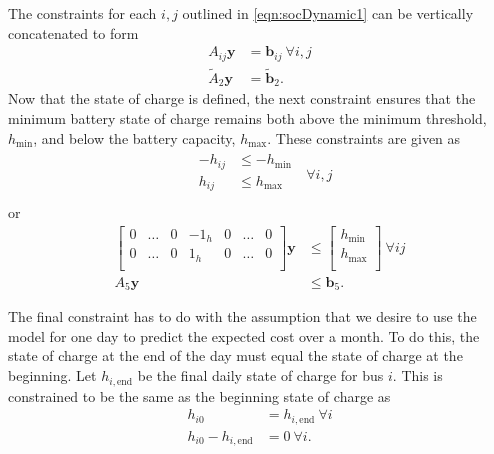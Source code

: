The constraints for each $i,j$ outlined in \eqref{eqn:socDynamic1} can be vertically concatenated to form
\begin{equation}\label{eqn:socDynamic3} \begin{aligned}
	A_{ij}\mathbf{y} &= \mathbf{b}_{ij} \ \forall i,j \\
	\tilde{A}_2\mathbf{y} &= \tilde{\mathbf{b}}_2.
\end{aligned} \end{equation}
Now that the state of charge is defined, the next constraint ensures that the minimum battery state of charge remains both above the minimum threshold, $h_{\text{min}}$, and below the battery capacity, $h_{\text{max}}$. These constraints are given as
\begin{equation}
	\begin{array}{l} \begin{aligned}
		-h_{ij} &\le -h_{\text{min}} \\
		h_{ij} &\le h_{\text{max}} \\
	\end{aligned}\end{array} \ \forall i,j
\end{equation}
or 
\begin{equation} \begin{aligned}
	\begin{bmatrix}
		0 & \hdots & 0 & -1_{h} & 0 & \hdots & 0\\
		0 & \hdots & 0 &  1_{h} & 0 & \hdots & 0\\
	\end{bmatrix}\mathbf{y} & \le 
	\begin{bmatrix}
 		h_{\text{min}}\\
 		h_{\text{max}}\\	
	\end{bmatrix} \ \forall ij\\
		A_5\mathbf{y} &\le \mathbf{b}_5.
\end{aligned} \end{equation}
\par The final constraint has to do with the assumption that we desire to use the model for one day to predict the expected cost over a month. To do this, the state of charge at the end of the day must equal the state of charge at the beginning. Let $h_{i,\text{end}}$ be the final daily state of charge for bus $i$. This is constrained to be the same as the beginning state of charge as
\begin{equation} \label{eqn:hEqual1} \begin{aligned}
	h_{i0} &= h_{i,\text{end}} \ \forall i \\
	h_{i0} - h_{i,\text{end}} &= 0 \ \forall i.  
\end{aligned} \end{equation}
